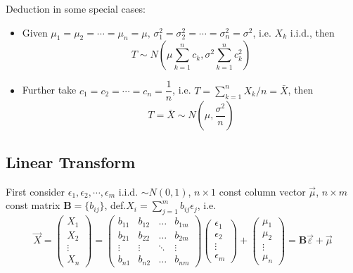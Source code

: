     Deduction in some special cases:
    \begin{itemize}
        \item Given $\mu_1=\mu_2=\cdots=\mu_n=\mu,\, \sigma^2_1=\sigma^2_2=\cdots=\sigma^2_n=\sigma^2$, i.e. $X_k$ i.i.d., then
        \begin{equation}\label{EqaDistributionOfSumOfiidNormal}
            T\sim   N(\mu\sum_{k=1}^n c_k,\sigma^2\sum_{k=1}^n c_k^2) 
        \end{equation}
        \item Further take $c_1=c_2=\cdots=c_n=\dfrac{1}{n}$, i.e. $T={\displaystyle \sum_{k=1}^n X_k /n}=\bar{X}$, then
        \begin{equation}    
            T=\bar{X}\sim N(\mu,\frac{\sigma^2}{n})    
        \end{equation}
    \end{itemize}





\subsection{Linear Transform}
    First consider $\epsilon_1,\epsilon_2,\cdots,\epsilon_m$ i.i.d. $\sim N(0,1)$, $n\times 1$ const column vector $\vec{\mu}$, $n\times m$ const matrix $\bm{B}=\{b_{ij}\}$, def.$X_i={\displaystyle\sum_{j=1}^m b_{ij}\epsilon_j}$, i.e.
    \begin{equation}
        \vec{X}=
        \begin{pmatrix}
            X_1\\X_2\\ \vdots\\X_n
        \end{pmatrix}
        =
        \begin{pmatrix}
            b_{11}&b_{12}&\ldots&b_{1m}\\
            b_{21}&b_{22}&\ldots&b_{2m}\\
            \vdots&\vdots&\ddots&\vdots\\
            b_{n1}&b_{n2}&\ldots&b_{nm}
        \end{pmatrix}
        \begin{pmatrix}
            \epsilon_1\\
            \epsilon_2\\
            \vdots\\
            \epsilon_m
        \end{pmatrix}
        +\begin{pmatrix}
            \mu _1\\\mu _2\\ \vdots\\\mu _n
        \end{pmatrix}=\bm{B}\vec{\varepsilon }+\vec{\mu }
    \end{equation}

